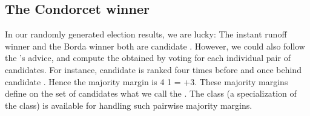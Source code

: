 \documentclass[a4paper,10pt,english]{sphinxhowto}
\begin{document}
\subsection{The Condorcet winner}
\label{\detokenize{tutorial:the-condorcet-winner}}
In our randomly generated election results, we are lucky: The instant runoff winner and the Borda winner both are candidate . However, we could also follow the ’s advice, and compute the  obtained by voting for each individual pair of candidates. For instance, candidate  is ranked four times before and once behind candidate . Hence the majority margin  is 4 \sphinxhyphen{} 1 = +3. These majority margins define on the set of candidates what we call the . The  class (a specialization of the  class) is available for handling such pairwise majority margins.
\end{document}
